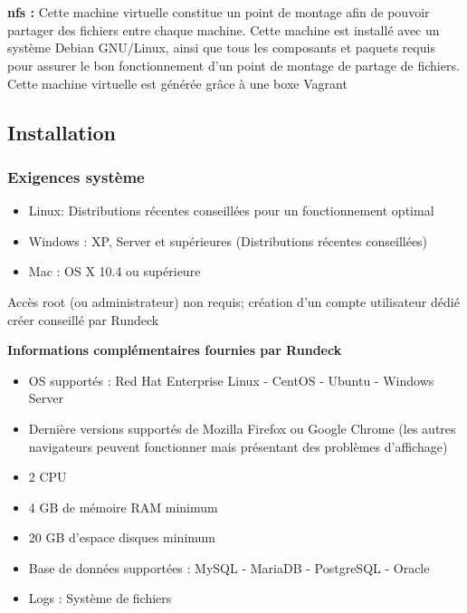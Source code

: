 \documentclass[12pt]{article}
\begin{document}
\\
\vspace{0.5cm}
\\
\textbf{nfs :}
Cette machine virtuelle constitue un point de montage afin de pouvoir partager des fichiers entre chaque machine. Cette machine est installé avec un système Debian GNU/Linux, ainsi que tous les composants et paquets requis pour assurer le bon fonctionnement d'un point de montage de partage de fichiers. Cette machine virtuelle est générée grâce à une boxe Vagrant 

\subsection{Installation}
\subsubsection{Exigences système}

\begin{itemize}
    \item Linux: Distributions récentes conseillées pour un fonctionnement optimal
    \item Windows : XP, Server et supérieures (Distributions récentes conseillées)
    \item Mac : OS X 10.4 ou supérieure
\end{itemize}

\vspace{0.5cm}

Accès root (ou administrateur) non requis; création d'un compte utilisateur dédié créer conseillé par Rundeck 

\vspace{0.5cm}

\textbf{Informations complémentaires fournies par Rundeck}
\begin{itemize}
    \item OS supportés :  Red Hat Enterprise Linux - CentOS - Ubuntu - Windows Server
    \item Dernière versions supportés de Mozilla Firefox ou Google Chrome (les autres navigateurs peuvent fonctionner mais présentant des problèmes d'affichage)
    \item 2 CPU
    \item 4 GB de mémoire RAM minimum
    \item 20 GB d'espace disques minimum
    \item Base de données supportées : MySQL - MariaDB - PostgreSQL - Oracle
    \item Logs : Système de fichiers
\end{itemize}
\end{document}
